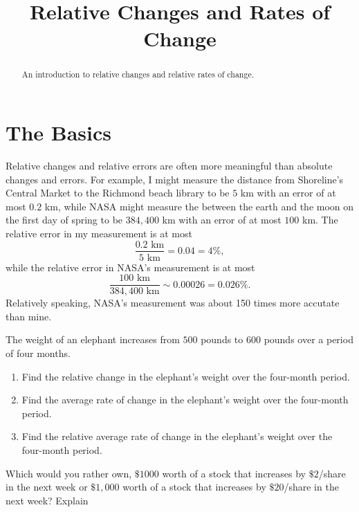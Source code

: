 \documentclass{ximera}
\title{Relative Changes and Rates of Change}
\begin{document}
\begin{abstract}
An introduction to relative changes and relative rates of change.
\end{abstract}
\maketitle


\section{The Basics}
Relative changes and relative errors are often more meaningful than absolute changes and errors. For example, I might measure the distance from Shoreline's Central Market to the Richmond beach library to be $5$ km with an  error of at most $0.2$ km, while NASA might measure the between the earth and the moon on the first day of spring to be $384,400$ km with an error of at most $100$ km. The relative error in my measurement is at most
\[
  \frac{0.2 \text{ km} }{5 \text{ km}} = 0.04 = 4\% ,
\] 
while the relative error in NASA's measurement is at most
\[ 
   \frac{100 \text{ km} }{384,400 \text{ km}} \sim 0.00026 = 0.026\% .
\]
Relatively speaking, NASA's measurement was about 150 times more accutate than mine.

\begin{question} \label{Qlfm3910z}
The weight of an elephant increases from $500$ pounds to $600$ pounds over a period of four months.
\begin{enumerate}
\item Find the relative change in the elephant's weight over the four-month period.

\item Find the average rate of change in the elephant's weight over the four-month period.

\item Find the relative average rate of change in the elephant's weight over the four-month period.
\end{enumerate}

\end{question}

\begin{question}  \label{QgOPfnljhn}
Which would you rather own, $\$1000$ worth of a stock that increases by $\$2$/share in the next week or $\$1,000$ worth of a stock that increases by $\$20$/share in the next week? Explain
\begin{freeResponse}
\end{freeResponse}
\end{question}
\end{document}
